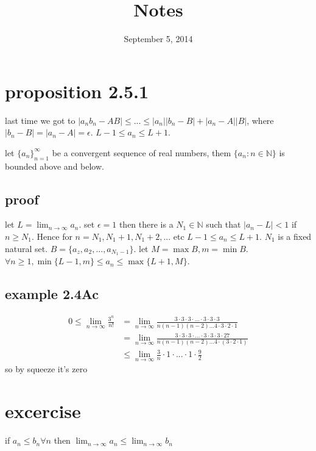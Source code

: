 \documentclass[letterpaper]{article}
\begin{document}
\title{Notes}
\date{September 5, 2014}
\maketitle
\section*{proposition 2.5.1}
last time we got to $|a_nb_n-AB|\le ...\le |a_n||b_n-B|+|a_n-A||B|$, where $|b_n-B|=|a_n-A|=\epsilon$. $L-1\le a_n\le L+1$.

let $\{a_n\}_{n=1}^\infty$ be a convergent sequence of real numbers, them $\{a_n:n\in\mathbb{N}\}$ is bounded above and below.

\subsection*{proof}
let $L=\lim_{n\to\infty}a_n$. set $\epsilon=1$ then there is a $N_1\in\mathbb{N}$ such that $|a_n-L|<1$ if $n\ge N_1$. Hence for $n=N_1,N_{1}+1,N_1+2,...$ etc $L-1\le a_n\le L+1$. $N_1$ is a fixed natural set. $B=\{a_z,a_2,...,a_{N_1-1}\}$. let $M=\max B, m=\min B$. $\forall n\ge1, \min\{L-1,m\}\le a_n\le\max\{L+1,M\}$.

\subsection*{example 2.4Ac}
\begin{align*}
  0\le\lim_{n\to\infty}\frac{3^n}{n!}&=\lim_{n\to\infty}\frac{3\cdot3\cdot3\cdot...\cdot3\cdot3\cdot3}{n(n-1)(n-2)...4\cdot3\cdot2\cdot1}\\
  &=\lim_{n\to\infty}\frac{3\cdot3\cdot3\cdot...\cdot3\cdot3\cdot3\cdot27}{n(n-1)(n-2)...4\cdot(3\cdot2\cdot1)}\\
  &\le \lim_{n\to\infty}\frac{3}{n}\cdot1\cdot...\cdot1\cdot\frac{9}{2}
\end{align*}
so by squeeze it's zero
\section*{excercise}
if $a_n\le b_n\forall n$ then $\lim_{n\to\infty}a_n\le\lim_{n\to\infty}b_n$
\end{document}
